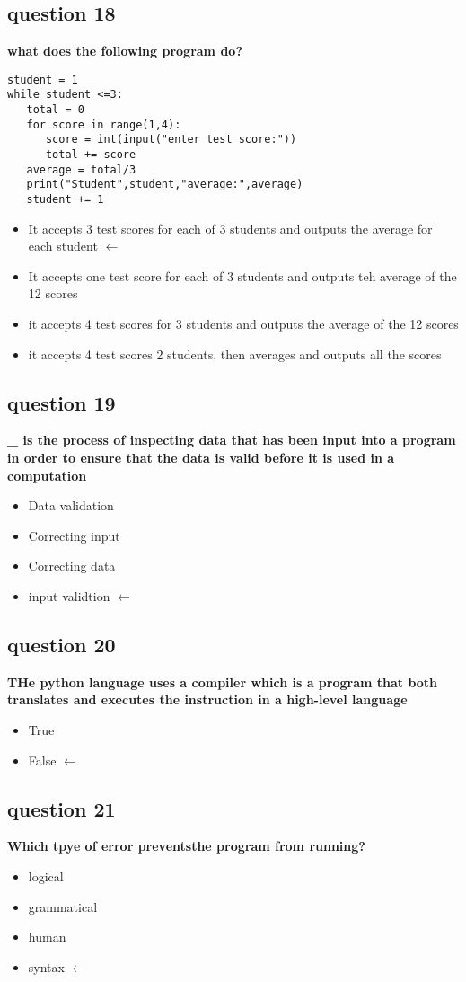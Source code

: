 \documentclass[10pt]{article}
\begin{document}
\subsection*{question 18}
\textbf{what does the following program do?}
\begin{verbatim}
student = 1
while student <=3:
   total = 0
   for score in range(1,4):
      score = int(input("enter test score:"))
      total += score
   average = total/3
   print("Student",student,"average:",average)
   student += 1
\end{verbatim}
\begin{itemize}
\item It accepts 3 test scores for each of 3 students and outputs the average for each student $\leftarrow$
\item It accepts one test score for each of 3 students and outputs teh average of the 12 scores
\item it accepts 4 test scores for 3 students and outputs the average of the 12 scores
\item it accepts 4 test scores 2 students, then averages and outputs all the scores
\end{itemize}
\subsection*{question 19}
\textbf{\_ is the process of inspecting data that has been input into a program in order to ensure that the data is valid before it is used in a computation}
\begin{itemize}
\item Data validation
\item Correcting input
\item Correcting data
\item input validtion $\leftarrow$
\end{itemize}
\subsection*{question 20}
\textbf{THe python language uses a compiler which is a program that both translates and executes the instruction in a high-level language}
\begin{itemize}
\item True
\item False $\leftarrow$
\end{itemize}
\subsection*{question 21}
\textbf{Which tpye of error preventsthe program from running?}
\begin{itemize}
\item logical 
\item grammatical
\item human
\item syntax $\leftarrow$
\end{itemize}
\end{document}
